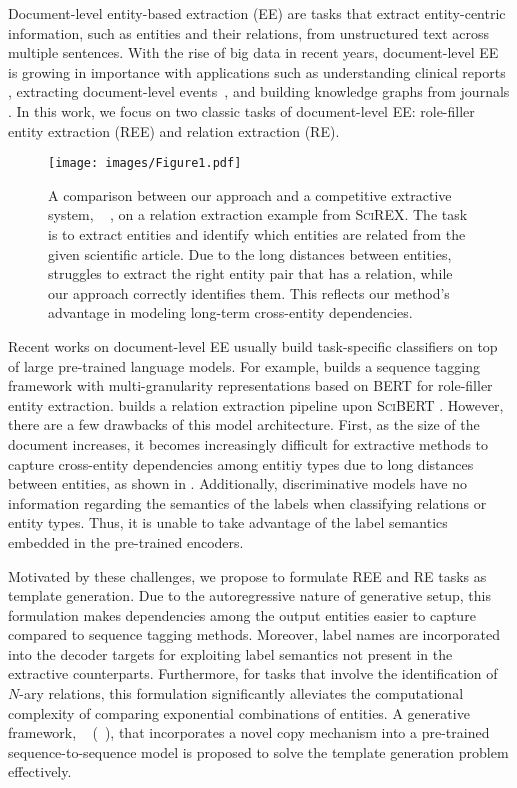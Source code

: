 \documentclass[11pt]{article}
\begin{document}
Document-level entity-based extraction (EE) are tasks that extract entity-centric information, such as entities and their relations, from unstructured text across multiple sentences. With the rise of big data in recent years, document-level EE is growing in importance with applications such as understanding clinical reports \cite{nye2020understanding}, extracting document-level events~\cite{huang2021document}, and building knowledge graphs from journals \cite{wu2020extracting}. In this work, we focus on two classic tasks of document-level EE: role-filler entity extraction (REE) and relation extraction (RE). 

\begin{figure}[t]
    \centering
    \texttt{[image: images/Figure1.pdf]}
    \caption{A comparison between our approach and a competitive extractive system, \scirexpipeline~ \cite{jain-etal-2020-scirex}, on a relation extraction example from \textsc{SciREX}. The task is to extract entities and identify which entities are related from the given scientific article. Due to the long distances between entities, \scirexpipeline~ struggles to extract the right entity pair that has a relation, while our approach correctly identifies them. This reflects our method's advantage in modeling long-term cross-entity dependencies.}
\vspace{-4mm}
    \label{fig:toy}
\end{figure}
Recent works on document-level EE usually build task-specific classifiers on top of large pre-trained language models. For example, \citet{du-cardie-2020-document} builds a sequence tagging framework with multi-granularity representations based on \textsc{BERT} \cite{Devlin_2019} for role-filler entity extraction. \citet{jain-etal-2020-scirex} builds a relation extraction pipeline upon \textsc{SciBERT} \cite{beltagy-etal-2019-scibert}. However, there are a few drawbacks of this model architecture. First, as the size of the document increases, it becomes increasingly difficult for extractive methods to capture cross-entity dependencies among entitiy types due to long distances between entities, as shown in . Additionally, discriminative models have no information regarding the semantics of the labels when classifying relations or entity types. Thus, it is unable to take advantage of the label semantics embedded in the pre-trained encoders. 


Motivated by these challenges, we propose to formulate REE and RE tasks as template generation. Due to the autoregressive nature of generative setup, this formulation makes dependencies among the output entities easier to capture compared to sequence tagging methods. Moreover, label names are incorporated into the decoder targets for exploiting label semantics not present in the extractive counterparts. Furthermore, for tasks that involve the identification of $N$-ary relations, this formulation significantly alleviates the computational complexity of comparing exponential combinations of entities. A generative framework, \modellong~ (\modelshort~), that incorporates a novel copy mechanism into a pre-trained sequence-to-sequence model is proposed to solve the template generation problem effectively. 
\end{document}
